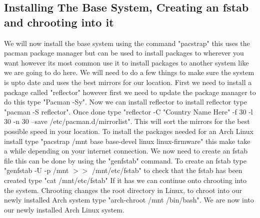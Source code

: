 \documentclass[titlepage]{article}
\begin{document}
   \subsection{Installing The Base System, Creating an fstab and chrooting into it}
  We will now install the base system using the command "pacstrap" this uses the pacman package manager but can be used to install packages to wherever you want however its most common use it to install packages to another system like we are going to do here. We will need to do a few things to make sure the system is upto date and uses the best mirrors for our location. First we need to install a package called "reflector" however first we need to update the package manager to do this type "Pacman -Sy". Now we can install reflector to install reflector type "pacman -S reflector". Once done type "reflector -C "Country Name Here" -f 30 -l 30 -n 30 --save /etc/pacman.d/mirrorlist". This will sort the mirrors for the best possible speed in your location. To install the packages needed for an Arch Linux install type "pacstrap /mnt base base-devel linux linux-firmware" this make take a while depending on your internet connection. We now need to create an fstab file this can be done by using the "genfstab" command. To create an fstab type "genfstab -U -p /mnt $>$$>$ /mnt/etc/fstab" to check that the fstab has been created type "cat /mnt/etc/fstab" If it has we can continue onto chrooting into the system. Chrooting changes the root directory
  in Linux, to chroot into our newly installed Arch system type "arch-chroot /mnt /bin/bash". We are now into our newly installed Arch Linux system.
  \vspace*{0.5 cm}
\end{document}
